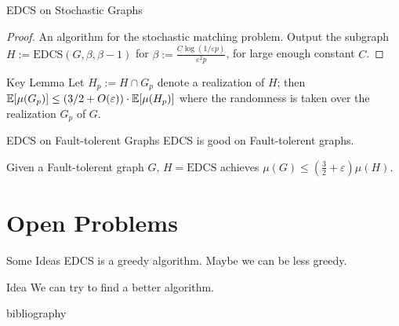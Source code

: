 \documentclass{beamer}
\newcommand{\EDCS}{\text{EDCS}}
\begin{document}
\begin{frame}{EDCS on Stochastic Graphs}
    \begin{proof}
        An algorithm for the stochastic matching problem.
        Output the subgraph $H := \EDCS(G,\beta,\beta-1)$ for $\beta:=\frac{C\log(1/\varepsilon p)}{\varepsilon^2p}$, for large enough constant $C$.
    \end{proof}
    \begin{block}{Key Lemma}
        Let $H_p := H \cap G_p$ denote a realization of $H$; then $\mathbb E[\mu(G_p)] \leq (3/2+O(\varepsilon))\cdot\mathbb E[\mu(H_p)]$
        where the randomness is taken over the realization $G_p$ of $G$.
    \end{block}
\end{frame}

\begin{frame}{EDCS on Fault-tolerent Graphs}
    EDCS is good on Fault-tolerent graphs.
    \begin{lemma}
        Given a Fault-tolerent graph $G$, $H=\EDCS$ achieves $\mu(G)\leq\left( \frac{3}{2}+\varepsilon \right)\mu(H)$.
    \end{lemma}
\end{frame}

\section{Open Problems}
\begin{frame}{Some Ideas}
    EDCS is a greedy algorithm. Maybe we can be less greedy.
    \begin{block}{Idea}
        We can try to find a better algorithm.        
    \end{block}
\end{frame} 

\begin{frame}{bibliography}
    \printbibliography
\end{frame}
\end{document}
